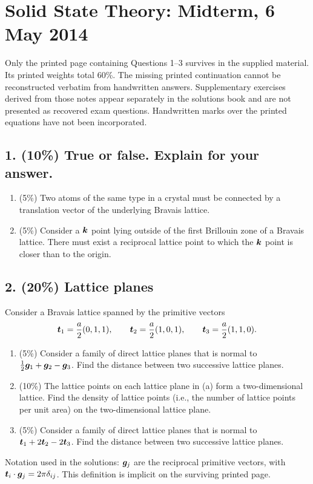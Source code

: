 \chapter{Solid State Theory: Midterm, 6 May 2014}
\label{q:theory-2014-05-midterm}
\begin{sourceNote}
Only the printed page containing Questions 1--3 survives in the supplied material. Its printed weights total 60\%. The missing printed continuation cannot be reconstructed verbatim from handwritten answers. Supplementary exercises derived from those notes appear separately in the solutions book and are not presented as recovered exam questions. Handwritten marks over the printed equations have not been incorporated.
\end{sourceNote}

\section*{1. (10\%) True or false. Explain for your answer.}
\begin{enumerate}[label=(\alph*)]
\item (5\%) Two atoms of the same type in a crystal must be connected by a translation vector of the underlying Bravais lattice.
\item (5\%) Consider a $\boldsymbol{k}$ point lying outside of the first Brillouin zone of a Bravais lattice. There must exist a reciprocal lattice point to which the $\boldsymbol{k}$ point is closer than to the origin.
\end{enumerate}

\section*{2. (20\%) Lattice planes}
Consider a Bravais lattice spanned by the primitive vectors
\[
\boldsymbol{t}_1=\frac a2(0,1,1),\qquad
\boldsymbol{t}_2=\frac a2(1,0,1),\qquad
\boldsymbol{t}_3=\frac a2(1,1,0).
\]
\begin{enumerate}[label=(\alph*)]
\item (5\%) Consider a family of direct lattice planes that is normal to $\frac12\boldsymbol{g}_1+\boldsymbol{g}_2-\boldsymbol{g}_3$. Find the distance between two successive lattice planes.
\item (10\%) The lattice points on each lattice plane in (a) form a two-dimensional lattice. Find the density of lattice points (i.e., the number of lattice points per unit area) on the two-dimensional lattice plane.
\item (5\%) Consider a family of direct lattice planes that is normal to $\boldsymbol{t}_1+2\boldsymbol{t}_2-2\boldsymbol{t}_3$. Find the distance between two successive lattice planes.
\end{enumerate}
\begin{sourceNote}
Notation used in the solutions: $\boldsymbol{g}_j$ are the reciprocal primitive vectors, with $\boldsymbol{t}_i\cdot\boldsymbol{g}_j=2\pi\delta_{ij}$. This definition is implicit on the surviving printed page.
\end{sourceNote}

